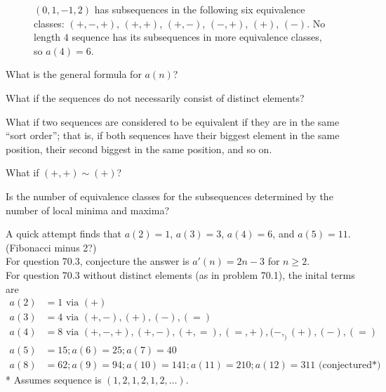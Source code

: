 \documentclass{article}
\begin{document}
\begin{figure}[!h]
\hspace{0.5cm}
    \caption{
      $(0, 1, -1, 2)$ has subsequences in the following six equivalence classes:
      $(+, -, +)$, $(+, +)$, $(+, -)$, $(-, +)$, $(+)$, $(-)$. No length $4$
      sequence has its subsequences in more equivalence classes, so $a(4) = 6$.
    }
  \end{figure}

\begin{question}
  What is the general formula for $a(n)$?
\end{question}
\begin{related}
  \item What if the sequences do not necessarily consist of distinct elements?
  \item What if two sequences are considered to be equivalent if they are in the
    same ``sort order''; that is, if both sequences have their biggest element
    in the same position, their second biggest in the same position, and so on.
  \item What if $(+, +) \sim (+)$?
  \item Is the number of equivalence classes for the subsequences determined by
   the number of local minima and maxima?
\end{related}

\begin{note}
  A quick attempt finds that $a(2) = 1$, $a(3) = 3$, $a(4)=6$, and $a(5)=11$.
  (Fibonacci minus 2?)\\
  For question 70.3, conjecture the answer is $a'(n) = 2n - 3$ for $n \geq 2$.\\
  For question 70.3 without distinct elements (as in problem 70.1), the inital terms are
  \begin{align*}
    a(2) &= 1 \text { via } (+)  \\
    a(3) &= 4 \text { via } (+, -), (+), (-), (=)  \\
    a(4) &= 8 \text { via } (+, -, +), (+, -), (+, =), (=, +), (-, _) (+), (-), (=)  \\
    a(5) &= 15; a(6) = 25; a(7) = 40\\
    a(8) &= 62; a(9) = 94; a(10) = 141; a(11) = 210; a(12) = 311 \text{ (conjectured*)}
  \end{align*}
  * Assumes sequence is $(1,2,1,2,1,2,\hdots)$.
\end{note}
\end{document}

